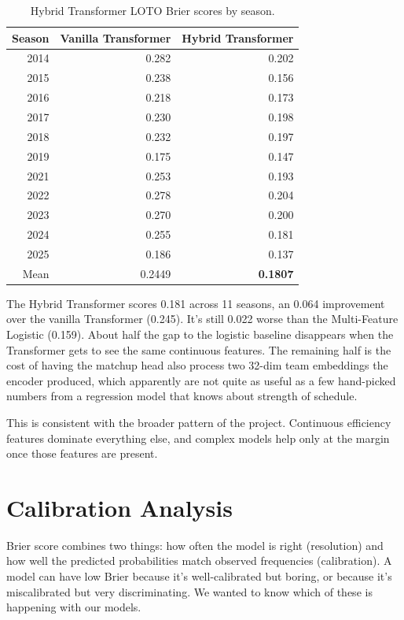 \documentclass[11pt,a4paper]{article}
\begin{document}
\begin{table}[h]
\centering
\caption{Hybrid Transformer LOTO Brier scores by season.}
\label{tab:hybrid-loto}
\small
\begin{tabular}{@{}rrr@{}}
\toprule
Season & Vanilla Transformer & Hybrid Transformer \\
\midrule
2014 & 0.282 & 0.202 \\
2015 & 0.238 & 0.156 \\
2016 & 0.218 & 0.173 \\
2017 & 0.230 & 0.198 \\
2018 & 0.232 & 0.197 \\
2019 & 0.175 & 0.147 \\
2021 & 0.253 & 0.193 \\
2022 & 0.278 & 0.204 \\
2023 & 0.270 & 0.200 \\
2024 & 0.255 & 0.181 \\
2025 & 0.186 & 0.137 \\
\midrule
Mean & 0.2449 & \textbf{0.1807} \\
\bottomrule
\end{tabular}
\end{table}

The Hybrid Transformer scores 0.181 across 11 seasons, an 0.064 improvement over the vanilla Transformer (0.245). It's still 0.022 worse than the Multi-Feature Logistic (0.159). About half the gap to the logistic baseline disappears when the Transformer gets to see the same continuous features. The remaining half is the cost of having the matchup head also process two 32-dim team embeddings the encoder produced, which apparently are not quite as useful as a few hand-picked numbers from a regression model that knows about strength of schedule.

This is consistent with the broader pattern of the project. Continuous efficiency features dominate everything else, and complex models help only at the margin once those features are present.


\section{Calibration Analysis}

Brier score combines two things: how often the model is right (resolution) and how well the predicted probabilities match observed frequencies (calibration). A model can have low Brier because it's well-calibrated but boring, or because it's miscalibrated but very discriminating. We wanted to know which of these is happening with our models.
\end{document}
